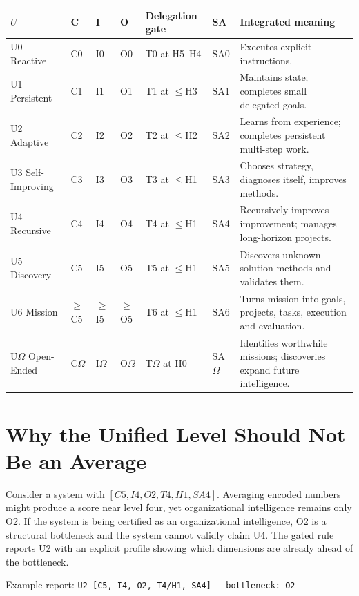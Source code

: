 \documentclass[11pt]{article}
\theoremstyle{definition}
\newcommand{\Om}{\ensuremath{\Omega}}
\begin{document}
\begin{table}[h]
\centering\small
\begin{tabularx}{\textwidth}{@{}llllllY@{}}
\toprule
$U$ & C & I & O & Delegation gate & SA & Integrated meaning \\
\midrule
U0 Reactive & C0 & I0 & O0 & T0 at H5--H4 & SA0 & Executes explicit instructions. \\
U1 Persistent & C1 & I1 & O1 & T1 at $\le$H3 & SA1 & Maintains state; completes small delegated goals. \\
U2 Adaptive & C2 & I2 & O2 & T2 at $\le$H2 & SA2 & Learns from experience; completes persistent multi-step work. \\
U3 Self-Improving & C3 & I3 & O3 & T3 at $\le$H1 & SA3 & Chooses strategy, diagnoses itself, improves methods. \\
U4 Recursive & C4 & I4 & O4 & T4 at $\le$H1 & SA4 & Recursively improves improvement; manages long-horizon projects. \\
U5 Discovery & C5 & I5 & O5 & T5 at $\le$H1 & SA5 & Discovers unknown solution methods and validates them. \\
U6 Mission & $\ge$C5 & $\ge$I5 & $\ge$O5 & T6 at $\le$H1 & SA6 & Turns mission into goals, projects, tasks, execution and evaluation. \\
U\Om{} Open-Ended & C\Om{} & I\Om{} & O\Om{} & T\Om{} at H0 & SA\Om{} & Identifies worthwhile missions; discoveries expand future intelligence. \\
\bottomrule
\end{tabularx}
\end{table}

\section{Why the Unified Level Should Not Be an Average}

Consider a system with $[C5, I4, O2, T4, H1, SA4]$. Averaging encoded numbers might produce a score near level four, yet organizational intelligence remains only O2. If the system is being certified as an organizational intelligence, O2 is a structural bottleneck and the system cannot validly claim U4. The gated rule reports U2 with an explicit profile showing which dimensions are already ahead of the bottleneck.

\begin{center}
Example report: \texttt{U2 [C5, I4, O2, T4/H1, SA4] --- bottleneck: O2}
\end{center}
\end{document}
